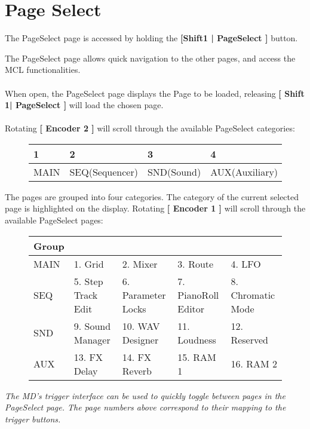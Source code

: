 \chapter{Page Select}
The PageSelect page is accessed by holding the \textbf{[Shift1 | PageSelect ]} button.

The PageSelect page allows quick navigation to the other pages, and access the MCL functionalities.
\\
\\
When open, the PageSelect page displays the Page to be loaded, releasing \textbf{[ Shift 1| PageSelect ]} will load
the chosen page.
\\
\\
Rotating \textbf{[ Encoder 2 ]} will scroll through the available PageSelect categories:

\begin{figure}[h]
    \begin{tabular}{|l|l|l|l|}
    \hline
    \rowcolor[HTML]{C0C0C0} 
    1    & 2              & 3          & 4              \\ \hline
    MAIN & SEQ(Sequencer) & SND(Sound) & AUX(Auxiliary) \\ \hline
    \end{tabular}
\end{figure}

The pages are grouped into four categories. The category of the current selected page is highlighted on the display.
Rotating \textbf{[ Encoder 1 ]} will scroll through the available PageSelect pages:

\begin{figure}[h]
    \begin{tabular}{|l|l|l|l|l|}
    \hline
    \rowcolor[HTML]{C0C0C0} 
    {\color[HTML]{000000} Group} & \multicolumn{4}{l|}{\cellcolor[HTML]{C0C0C0}{\color[HTML]{000000} Pages}}      \\ \hline
    MAIN                              & 1. Grid            & 2. Mixer         & 3. Route           & 4. LFO            \\ \hline
    SEQ                               & 5. Step Track Edit & 6. Parameter Locks & 7. PianoRoll Editor & 8. Chromatic Mode \\ \hline
    SND                               & 9. Sound Manager   & 10. WAV Designer & 11. Loudness       & 12. Reserved      \\ \hline
    AUX                               & 13. FX Delay       & 14. FX Reverb    & 15. RAM 1          & 16. RAM 2         \\ \hline
    \end{tabular}
\end{figure}

\textit{The MD's trigger interface can be used to quickly toggle between pages in the PageSelect page. The page numbers above correspond to their mapping to the trigger buttons. }






